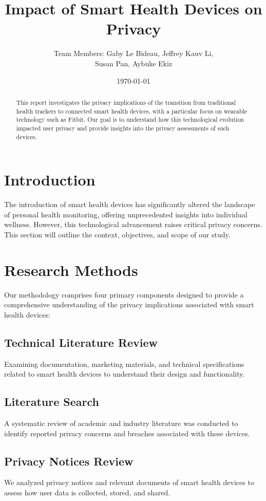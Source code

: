\documentclass[12pt]{article}
\title{Impact of Smart Health Devices on Privacy}
\author{Team Members: Gaby Le Bideau, Jeffrey Kauv Li, \\ Susan Pan, Aybuke Ekiz}
\date{\today}
\begin{document}
\maketitle

\begin{abstract}
This report investigates the privacy implications of the transition from traditional health trackers to connected smart health devices, with a particular focus on wearable technology such as Fitbit. Our goal is to understand how this technological evolution impacted user privacy and provide insights into the privacy assessments of such devices.
\end{abstract}

\section{Introduction}
The introduction of smart health devices has significantly altered the landscape of personal health monitoring, offering unprecedented insights into individual wellness. However, this technological advancement raises critical privacy concerns. This section will outline the context, objectives, and scope of our study.

\section{Research Methods}
Our methodology comprises four primary components designed to provide a comprehensive understanding of the privacy implications associated with smart health devices:

\subsection{Technical Literature Review}
Examining documentation, marketing materials, and technical specifications related to smart health devices to understand their design and functionality.

\subsection{Literature Search}
A systematic review of academic and industry literature was conducted to identify reported privacy concerns and breaches associated with these devices.

\subsection{Privacy Notices Review}
We analyzed privacy notices and relevant documents of smart health devices to assess how user data is collected, stored, and shared.
\end{document}
